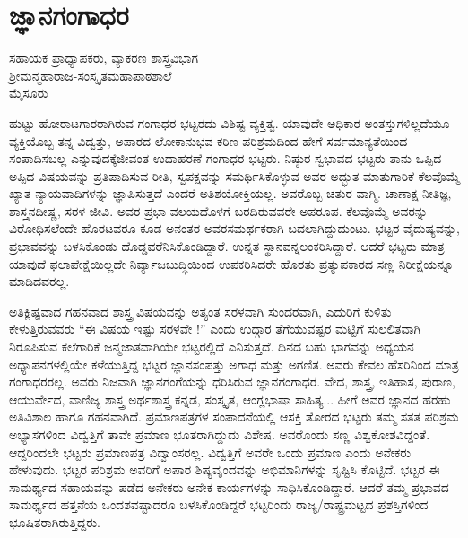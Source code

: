 {\fontsize{14}{16}\selectfont
\chapter{ಜ್ಞಾನಗಂಗಾಧರ}

\begin{center}

ಸಹಾಯಕ ಪ್ರಾಧ್ಯಾಪಕರು, ವ್ಯಾಕರಣ ಶಾಸ್ತ್ರವಿಭಾಗ\\
ಶ್ರೀಮನ್ಮಹಾರಾಜ-ಸಂಸ್ಕೃತಮಹಾಪಾಠಶಾಲೆ\\
ಮೈಸೂರು
\addrule
\end{center}

ಹುಟ್ಟು ಹೋರಾಟಗಾರರಾಗಿರುವ ಗಂಗಾಧರ ಭಟ್ಟರದು ವಿಶಿಷ್ಟ ವ್ಯಕ್ತಿತ್ವ. ಯಾವುದೇ ಅಧಿಕಾರ ಅಂತಸ್ತುಗಳಿಲ್ಲದೆಯೂ  ವ್ಯಕ್ತಿಯೊಬ್ಬ ತನ್ನ ವಿದ್ವತ್ತು, ಅಪಾರದ ಲೋಕಾನುಭವ ಕಠಿಣ ಪರಿಶ್ರಮದಿಂದ ಹೇಗೆ ಸರ್ವಮಾನ್ಯತೆಯಿಂದ ಸಂಪಾದಿಸಬಲ್ಲ ಎನ್ನುವುದಕ್ಕೆ\break ಜೀವಂತ ಉದಾಹರಣೆ ಗಂಗಾಧರ ಭಟ್ಟರು. ನಿಷ್ಠುರ ಸ್ವಭಾವದ ಭಟ್ಟರು ತಾನು ಒಪ್ಪಿದ \enginline{-}ಅಪ್ಪಿದ ವಿಷಯವನ್ನು ಪ್ರತಿಪಾದಿಸುವ ರೀತಿ, ಸ್ವಪಕ್ಷವನ್ನು ಸಮರ್ಥಿಸಿಕೊಳ್ಳುವ ಅವರ ಅದ್ಭುತ ಮಾತುಗಾರಿಕೆ ಕೆಲವೊಮ್ಮೆ ಖ್ಯಾತ ನ್ಯಾಯವಾದಿಗಳನ್ನು ಜ್ಞಾಪಿಸುತ್ತದೆ ಎಂದರೆ ಅತಿಶಯೋಕ್ತಿಯಲ್ಲ. ಅವರೊಬ್ಬ ಚತುರ ವಾಗ್ಮಿ. ಚಾಣಾಕ್ಷ ನೀತಿಜ್ಞ, ಶಾಸ್ತ್ರ\break ನದೀಷ್ಣ, ಸರಳ ಜೀವಿ. ಅವರ ಪ್ರಭಾ ವಲಯದೊಳಗೆ ಬರದಿರುವವರೇ ಅಪರೂಪ. ಕೆಲವೊಮ್ಮೆ ಅವರನ್ನು ವಿರೋಧಿಸಲೆಂದೇ ಹೊರಟವರೂ ಕೂಡ ಅನಂತರ ಅವರ\break ಸಮರ್ಥಕರಾಗಿ ಬದಲಾಗಿದ್ದುದುಂಟು. ಭಟ್ಟರ ವೈದುಷ್ಯವನ್ನು, ಪ್ರಭಾವವನ್ನು ಬಳಸಿ\-ಕೊಂಡು ದೊಡ್ಡವರೆನಿಸಿಕೊಂಡಿದ್ದಾರೆ. ಉನ್ನತ ಸ್ಥಾನವನ್ನಲಂಕರಿಸಿದ್ದಾರೆ. ಆದರೆ ಭಟ್ಟರು ಮಾತ್ರ ಯಾವುದೆ ಫಲಾಪೇಕ್ಷೆಯಿಲ್ಲದೇ ನಿರ್ವ್ಯಾಜಬುದ್ಧಿಯಿಂದ ಉಪಕರಿಸಿದರೇ ಹೊರತು ಪ್ರತ್ಯುಪಕಾರದ ಸಣ್ಣ ನಿರೀಕ್ಷೆಯನ್ನೂ ಮಾಡಿದವರಲ್ಲ. 

ಅತಿಕ್ಲಿಷ್ಟವಾದ ಗಹನವಾದ ಶಾಸ್ತ್ರ ವಿಷಯವನ್ನು ಅತ್ಯಂತ ಸರಳವಾಗಿ ಸುಂದರವಾಗಿ, ಎದುರಿಗೆ ಕುಳಿತು ಕೇಳುತ್ತಿರುವವರು “ಈ ವಿಷಯ ಇಷ್ಟು ಸರಳವೇ !” ಎಂದು ಉದ್ಗಾರ ತೆಗೆಯುವಷ್ಟರ ಮಟ್ಟಿಗೆ ಸುಲಲಿತವಾಗಿ ನಿರೂಪಿಸುವ \hbox{ಕಲೆಗಾರಿಕೆ} ಜನ್ಮಜಾತವಾಗಿಯೇ ಭಟ್ಟರಲ್ಲಿದೆ ಎನಿಸುತ್ತದೆ. ದಿನದ ಬಹು ಭಾಗವನ್ನು \hbox{ಅಧ್ಯಯನ} \hbox{ಅಧ್ಯಾಪನ}ಗಳಲ್ಲಿಯೇ ಕಳೆಯುತ್ತಿದ್ದ ಭಟ್ಟರ ಜ್ಞಾನಸಂಪತ್ತು ಅಗಾಧ ಮತ್ತು \hbox{ಅಗಣಿತ.} ಅವರು ಕೇವಲ ಹೆಸರಿನಿಂದ ಮಾತ್ರ ಗಂಗಾಧರರಲ್ಲ. ಅವರು ನಿಜವಾಗಿ ಜ್ಞಾನ\-ಗಂಗೆಯನ್ನು ಧರಿಸಿರುವ ಜ್ಞಾನಗಂಗಾಧರ. ವೇದ, ಶಾಸ್ತ್ರ, ಇತಿಹಾಸ, ಪುರಾಣ, ಆಯುರ್ವೇದ, ವಾಣಿಜ್ಯ ಶಾಸ್ತ್ರ ಅರ್ಥಶಾಸ್ತ್ರ ಕನ್ನಡ, ಸಂಸ್ಕೃತ, ಆಂಗ್ಲಭಾಷಾ ಸಾಹಿತ್ಯ... ಹೀಗೆ ಅವರ ಜ್ಞಾನದ ಹರಹು ಅತಿವಿಶಾಲ ಹಾಗೂ ಗಹನವಾಗಿದೆ. ಪ್ರಮಾಣಪತ್ರಗಳ ಸಂಪಾದನೆಯಲ್ಲಿ ಆಸಕ್ತಿ ತೋರದ ಭಟ್ಟರು ತಮ್ಮ ಸತತ \hbox{ಪರಿಶ್ರಮ} ಅಭ್ಯಾಸಗಳಿಂದ \hbox{ವಿದ್ವತ್ತಿಗೆ} ತಾವೇ ಪ್ರಮಾಣ ಭೂತರಾಗಿದ್ದುದು ವಿಶೇಷ. \hbox{ಅವರೊಂದು} ಸಣ್ಣ \hbox{ವಿಶ್ವಕೋಶವಿದ್ದಂತೆ.} ಆದ್ದರಿಂದಲೇ ಭಟ್ಟರು ಪ್ರಮಾಣಪತ್ರ ವಿದ್ವಾಂಸರಲ್ಲ. ವಿದ್ವತ್ತಿಗೆ ಅವರೇ ಒಂದು ಪ್ರಮಾಣ ಎಂದು ಅನೇಕರು ಹೇಳುವುದು. ಭಟ್ಟರ ಪರಿಶ್ರಮ ಅವರಿಗೆ ಅಪಾರ ಶಿಷ್ಯವೃಂದವನ್ನು ಅಭಿಮಾನಿಗಳನ್ನು ಸೃಷ್ಟಿಸಿ ಕೊಟ್ಟಿದೆ. ಭಟ್ಟರ ಈ ಸಾಮರ್ಥ್ಯದ ಸಹಾಯವನ್ನು ಪಡೆದ ಅನೇಕರು ಅನೇಕ ಕಾರ್ಯಗಳನ್ನು ಸಾಧಿಸಿಕೊಂಡಿದ್ದಾರೆ. ಆದರೆ ತಮ್ಮ ಪ್ರಭಾವದ ಸಾಮರ್ಥ್ಯದ ಹತ್ತನೆಯ ಒಂದಶವಷ್ಟಾದರೂ ಬಳಸಿಕೊಂಡಿದ್ದರೆ ಭಟ್ಟರಿಂದು ರಾಜ್ಯ/ರಾಷ್ಟ್ರಮಟ್ಟದ ಪ್ರಶಸ್ತಿಗಳಿಂದ ಭೂಷಿತರಾಗಿರುತ್ತಿದ್ದರು.

}
